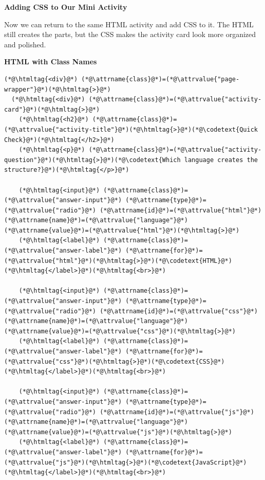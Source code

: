 \documentclass{article}
\begin{document}
\pagebreak

\textbf{\Bitter\textcolor{naranja}{Adding CSS to Our Mini Activity}}

\vspace{0.1cm}

Now we can return to the same HTML activity and add CSS to it.
The HTML still creates the parts, but the CSS makes the activity card look more organized and polished.

\vspace{0.3cm}

\noindent
\begin{minipage}[t]{0.48\textwidth}
  \textbf{\Bitter\textcolor{naranja}{HTML with Class Names}}

  \vspace{0.15cm}

  \begin{lstlisting}
(*@\htmltag{<div}@*) (*@\attrname{class}@*)=(*@\attrvalue{"page-wrapper"}@*)(*@\htmltag{>}@*)
  (*@\htmltag{<div}@*) (*@\attrname{class}@*)=(*@\attrvalue{"activity-card"}@*)(*@\htmltag{>}@*)
    (*@\htmltag{<h2}@*) (*@\attrname{class}@*)=(*@\attrvalue{"activity-title"}@*)(*@\htmltag{>}@*)(*@\codetext{Quick Check}@*)(*@\htmltag{</h2>}@*)
    (*@\htmltag{<p}@*) (*@\attrname{class}@*)=(*@\attrvalue{"activity-question"}@*)(*@\htmltag{>}@*)(*@\codetext{Which language creates the structure?}@*)(*@\htmltag{</p>}@*)

    (*@\htmltag{<input}@*) (*@\attrname{class}@*)=(*@\attrvalue{"answer-input"}@*) (*@\attrname{type}@*)=(*@\attrvalue{"radio"}@*) (*@\attrname{id}@*)=(*@\attrvalue{"html"}@*) (*@\attrname{name}@*)=(*@\attrvalue{"language"}@*) (*@\attrname{value}@*)=(*@\attrvalue{"html"}@*)(*@\htmltag{>}@*)
    (*@\htmltag{<label}@*) (*@\attrname{class}@*)=(*@\attrvalue{"answer-label"}@*) (*@\attrname{for}@*)=(*@\attrvalue{"html"}@*)(*@\htmltag{>}@*)(*@\codetext{HTML}@*)(*@\htmltag{</label>}@*)(*@\htmltag{<br>}@*)

    (*@\htmltag{<input}@*) (*@\attrname{class}@*)=(*@\attrvalue{"answer-input"}@*) (*@\attrname{type}@*)=(*@\attrvalue{"radio"}@*) (*@\attrname{id}@*)=(*@\attrvalue{"css"}@*) (*@\attrname{name}@*)=(*@\attrvalue{"language"}@*) (*@\attrname{value}@*)=(*@\attrvalue{"css"}@*)(*@\htmltag{>}@*)
    (*@\htmltag{<label}@*) (*@\attrname{class}@*)=(*@\attrvalue{"answer-label"}@*) (*@\attrname{for}@*)=(*@\attrvalue{"css"}@*)(*@\htmltag{>}@*)(*@\codetext{CSS}@*)(*@\htmltag{</label>}@*)(*@\htmltag{<br>}@*)

    (*@\htmltag{<input}@*) (*@\attrname{class}@*)=(*@\attrvalue{"answer-input"}@*) (*@\attrname{type}@*)=(*@\attrvalue{"radio"}@*) (*@\attrname{id}@*)=(*@\attrvalue{"js"}@*) (*@\attrname{name}@*)=(*@\attrvalue{"language"}@*) (*@\attrname{value}@*)=(*@\attrvalue{"js"}@*)(*@\htmltag{>}@*)
    (*@\htmltag{<label}@*) (*@\attrname{class}@*)=(*@\attrvalue{"answer-label"}@*) (*@\attrname{for}@*)=(*@\attrvalue{"js"}@*)(*@\htmltag{>}@*)(*@\codetext{JavaScript}@*)(*@\htmltag{</label>}@*)(*@\htmltag{<br>}@*)


\end{lstlisting}
\end{minipage}
\end{document}
